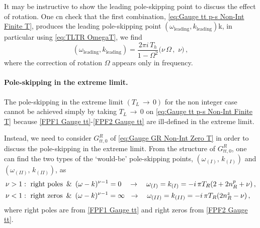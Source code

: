 \documentclass[11pt,a4paper]{article}
\newcommand{\ra}{\rightarrow}
\begin{document}
It may be instructive to show the leading pole-skipping point to discuss the effect of rotation. One cn check that the first combination, \eqref{eq:Gauge tt p-s Non-Int Finite T}, produces the leading pole-skipping point $(\omega_{\text{leading}}, k_{\text{leading}})$k, in particular using \eqref{eq:TLTR OmegaT}, we find
\begin{equation} \label{LPSPHERM11 Gauge tt}
    (\omega_{\text{leading}}, k_{\text{leading}}) = \frac{2\pi i \,T_h}{1-\Omega^2}\bigg( \nu \, \Omega \,,\,\, \nu \bigg)\,,
\end{equation}
where the correction of rotation $\Omega$ appears only in frequency.

\paragraph{Pole-skipping in the extreme limit.}
The pole-skipping in the extreme limit $(T_L \, \ra \, 0)$ for the non integer case cannot be achieved simply by taking $T_L\,\ra\,0$ on \eqref{eq:Gauge tt p-s Non-Int Finite T} because \eqref{FPF1 Gauge tt}-\eqref{FPF2 Gauge tt} are ill-defined in the extreme limit.

Instead, we need to consider $G^R_{tt,0}$ of \eqref{eq:Gauge GR Non-Int Zero T} in order to discuss the pole-skipping in the extreme limit. From the structure of $G^R_{tt,0}$, one can find the two types of the `would-be' pole-skipping points, $(\omega_{(I)},\, k_{(I)})$ and $(\omega_{(II)},\, k_{(II)})$, as
\begin{align}\label{WBP1 Gauge tt}
\begin{split}
\nu > 1&:\,\,  \text{right poles} \,\,\,\&\,\,\, (\omega-k)^{\nu - 1} = 0 \quad \rightarrow\quad \omega_{(I)} = k_{(I)} = -i\,\pi T_R (2 + 2 n^{p}_{R} + \nu)\,,\\
%
\nu < 1&:\,\,  \text{right zeros} \,\,\,\&\,\,\, (\omega-k)^{\nu - 1} = \infty \hspace{0.22cm} \rightarrow\quad \omega_{(II)} = k_{(II)} = -i\,\pi T_R (2 n^{z}_{R} - \nu)\,,
\end{split} 
\end{align}
where right poles are from \eqref{FPF1 Gauge tt} and right zeros from \eqref{FPF2 Gauge tt}.
\end{document}
